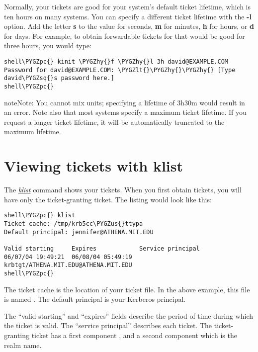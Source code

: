 \documentclass[letterpaper,10pt,english]{sphinxmanual}
\def\PYGZus{\char`\_}
\def\PYGZlt{\char`\<}
\def\PYGZpc{\char`\%}
\def\PYGZhy{\char`\-}
\def\PYGZsq{\char`\'}
\begin{document}
Normally, your tickets are good for your system's default ticket
lifetime, which is ten hours on many systems.  You can specify a
different ticket lifetime with the \textbf{-l} option.  Add the letter
\textbf{s} to the value for seconds, \textbf{m} for minutes, \textbf{h} for hours, or
\textbf{d} for days.  For example, to obtain forwardable tickets for
 that would be good for three hours, you would
type:

\begin{Verbatim}[commandchars=\\\{\}]
shell\PYGZpc{} kinit \PYGZhy{}f \PYGZhy{}l 3h david@EXAMPLE.COM
Password for david@EXAMPLE.COM: \PYGZlt{}\PYGZhy{}\PYGZhy{} [Type david\PYGZsq{}s password here.]
shell\PYGZpc{}
\end{Verbatim}

\begin{notice}{note}{Note:}
You cannot mix units; specifying a lifetime of 3h30m would
result in an error.  Note also that most systems specify a
maximum ticket lifetime.  If you request a longer ticket
lifetime, it will be automatically truncated to the maximum
lifetime.
\end{notice}


\section{Viewing tickets with klist}
\label{user/tkt_mgmt:viewing-tickets-with-klist}\label{user/tkt_mgmt:view-tkt}
The {\hyperref[user/user_commands/klist:klist-1]{\emph{klist}}} command shows your tickets.  When you first obtain
tickets, you will have only the ticket-granting ticket.  The listing
would look like this:

\begin{Verbatim}[commandchars=\\\{\}]
shell\PYGZpc{} klist
Ticket cache: /tmp/krb5cc\PYGZus{}ttypa
Default principal: jennifer@ATHENA.MIT.EDU

Valid starting     Expires            Service principal
06/07/04 19:49:21  06/08/04 05:49:19  krbtgt/ATHENA.MIT.EDU@ATHENA.MIT.EDU
shell\PYGZpc{}
\end{Verbatim}

The ticket cache is the location of your ticket file. In the above
example, this file is named . The default
principal is your Kerberos principal.

The ``valid starting'' and ``expires'' fields describe the period of time
during which the ticket is valid.  The ``service principal'' describes
each ticket.  The ticket-granting ticket has a first component
, and a second component which is the realm name.
\end{document}
